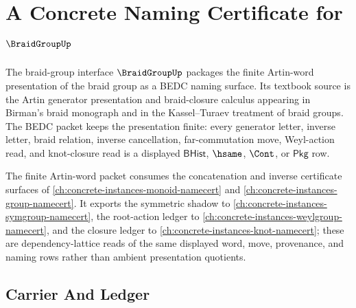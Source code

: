 \chapter{A Concrete Naming Certificate for $\BraidGroupUp$}
\label{ch:concrete-instances-braidgroup-namecert}

The braid-group interface $\BraidGroupUp$ packages the finite Artin-word presentation of the braid group as a BEDC naming surface. Its textbook source is the Artin generator presentation and braid-closure calculus appearing in Birman's braid monograph and in the Kassel--Turaev treatment of braid groups. The BEDC packet keeps the presentation finite: every generator letter, inverse letter, braid relation, inverse cancellation, far-commutation move, Weyl-action read, and knot-closure read is a displayed $\mathsf{BHist}$, $\hsame$, $\Cont$, or $\mathsf{Pkg}$ row.

The finite Artin-word packet consumes the concatenation and inverse certificate surfaces of \autoref{ch:concrete-instances-monoid-namecert} and \autoref{ch:concrete-instances-group-namecert}. It exports the symmetric shadow to \autoref{ch:concrete-instances-symgroup-namecert}, the root-action ledger to \autoref{ch:concrete-instances-weylgroup-namecert}, and the closure ledger to \autoref{ch:concrete-instances-knot-namecert}; these are dependency-lattice reads of the same displayed word, move, provenance, and naming rows rather than ambient presentation quotients.

\section{Carrier And Ledger}
\label{sec:braidgroup-carrier-ledger}

